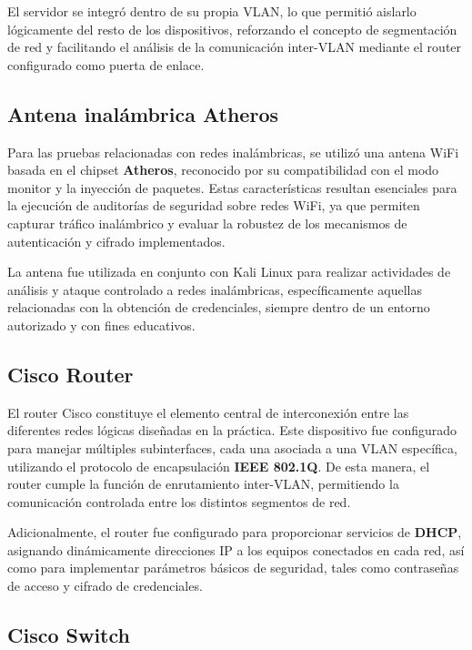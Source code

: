 El servidor se integró dentro de su propia VLAN, lo que permitió aislarlo lógicamente del resto de los dispositivos, reforzando el concepto de segmentación de red y facilitando el análisis de la comunicación inter-VLAN mediante el router configurado como puerta de enlace.

\subsection{Antena inalámbrica Atheros}

Para las pruebas relacionadas con redes inalámbricas, se utilizó una antena WiFi basada en el chipset \textbf{Atheros}, reconocido por su compatibilidad con el modo monitor y la inyección de paquetes. Estas características resultan esenciales para la ejecución de auditorías de seguridad sobre redes WiFi, ya que permiten capturar tráfico inalámbrico y evaluar la robustez de los mecanismos de autenticación y cifrado implementados.

La antena fue utilizada en conjunto con Kali Linux para realizar actividades de análisis y ataque controlado a redes inalámbricas, específicamente aquellas relacionadas con la obtención de credenciales, siempre dentro de un entorno autorizado y con fines educativos.

\subsection{Cisco Router}

El router Cisco constituye el elemento central de interconexión entre las diferentes redes lógicas diseñadas en la práctica. Este dispositivo fue configurado para manejar múltiples subinterfaces, cada una asociada a una VLAN específica, utilizando el protocolo de encapsulación \textbf{IEEE 802.1Q}. De esta manera, el router cumple la función de enrutamiento inter-VLAN, permitiendo la comunicación controlada entre los distintos segmentos de red.

Adicionalmente, el router fue configurado para proporcionar servicios de \textbf{DHCP}, asignando dinámicamente direcciones IP a los equipos conectados en cada red, así como para implementar parámetros básicos de seguridad, tales como contraseñas de acceso y cifrado de credenciales.

\subsection{Cisco Switch}

